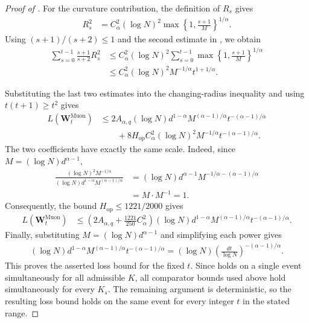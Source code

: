 \documentclass[11pt]{article}
\theoremstyle{definition}
\newcommand{\Wb}{\mathbf{W}}
\newcommand{\Hop}{H_{\mathrm{op}}}
\begin{document}
\begin{proof}[Proof of ]
For the curvature contribution, the definition of $R_s$ gives
\begin{align*}
 R_s^2
 &=C_\alpha^2(\log N)^2
 \max\left\{1,\frac{s+1}{M}\right\}^{1/\alpha}.
\end{align*}
Using $(s+1)/(s+2)\leq1$ and the second estimate in
, we obtain
\begin{align*}
 \sum_{s=0}^{t-1}\frac{s+1}{s+2}R_s^2
 &\leq
 C_\alpha^2(\log N)^2
 \sum_{s=0}^{t-1}
 \max\left\{1,\frac{s+1}{M}\right\}^{1/\alpha}\\
 &\leq
 C_\alpha^2(\log N)^2
 M^{-1/\alpha}t^{1+1/\alpha}.
\end{align*}

Substituting the last two estimates into the changing-radius inequality and
using $t(t+1)\geq t^2$ gives
\begin{align*}
 L(\Wb_t^{\mathrm{Muon}})
 &\leq
 2A_{\alpha,q}(\log N)d^{1-\alpha}
 M^{(\alpha-1)/\alpha}t^{-(\alpha-1)/\alpha}\\
 &\qquad+
 8\Hop C_\alpha^2(\log N)^2
 M^{-1/\alpha}t^{-(\alpha-1)/\alpha}.
\end{align*}
The two coefficients have exactly the same scale.  Indeed, since
$M=(\log N)d^{\alpha-1}$,
\begin{align*}
 \frac{(\log N)^2M^{-1/\alpha}}
 {(\log N)d^{1-\alpha}M^{(\alpha-1)/\alpha}}
 &=(\log N)d^{\alpha-1}
 M^{-1/\alpha-(\alpha-1)/\alpha}\\
 &=M\cdot M^{-1}=1.
\end{align*}
Consequently, the bound $\Hop\leq1221/2000$ gives
\begin{align*}
 L(\Wb_t^{\mathrm{Muon}})
 &\leq
 \left(
  2A_{\alpha,q}
  +\frac{1221}{250}C_\alpha^2
 \right)
 (\log N)d^{1-\alpha}
 M^{(\alpha-1)/\alpha}t^{-(\alpha-1)/\alpha}.
\end{align*}
Finally, substituting $M=(\log N)d^{\alpha-1}$ and simplifying each power
gives
\begin{align*}
 (\log N)d^{1-\alpha}
 M^{(\alpha-1)/\alpha}t^{-(\alpha-1)/\alpha}=
 (\log N)\left(\frac{dt}{\log N}\right)^{-(\alpha-1)/\alpha}.
\end{align*}
This proves the asserted loss bound for the fixed $t$.  Since  holds on a single event simultaneously for all
admissible $K$, all comparator bounds used above hold simultaneously for
every $K_s$. The remaining argument is deterministic, so the resulting
loss bound holds on the same event for every integer $t$ in the stated range.
\end{proof}
\end{document}
